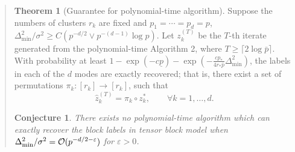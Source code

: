 \documentclass[11pt]{article}
\theoremstyle{plain}
\newtheorem{conjecture}{Conjecture}
\theoremstyle{definition}
\newtheorem{Theorem}{Theorem}
\newcommand{\0}{{\mathbf{0}}}
\newcommand{\1}{{\mathbf{1}}}
\begin{document}
\begin{enumerate}
\begin{quote}
\begin{Theorem}[Guarantee for polynomial-time algorithm]
Suppose the numbers of clusters $r_k$ are fixed and $p_1=\cdots=p_d=p$, $\Delta^2_{\min}/\sigma^2 \geq C\left( p^{-d/2} \vee p^{-(d-1)}\log p\right)$. Let $z^{(T)}_k$ be the $T$-th iterate generated from the polynomial-time Algorithm 2, where $T \geq \lceil2\log \bar p \rceil$. With probability at least $1-\exp(-c\underline p)-\exp\left(-\frac{c p_*}{4r_{*}\bar p}\Delta_{\min}^2\right)$, the labels in each of the $d$ modes are exactly recovered; that is,
there exist a set of permutations $\pi_k\colon [r_k]\to [r_k]$, such that
	\begin{equation*}
		\hat z_k^{(T)} = \pi_k \circ z_k^*,\qquad \forall k=1,\ldots,d.
	\end{equation*}

\end{Theorem}
	
\begin{conjecture}
There exists no polynomial-time algorithm which can exactly recover the block labels in tensor block model when $\Delta^2_{\min}/\sigma^2 = \mathcal{O}(p^{-d/2-\varepsilon})$ for $\varepsilon>0$.
\end{conjecture}
\end{quote}
\end{enumerate}
\end{document}
